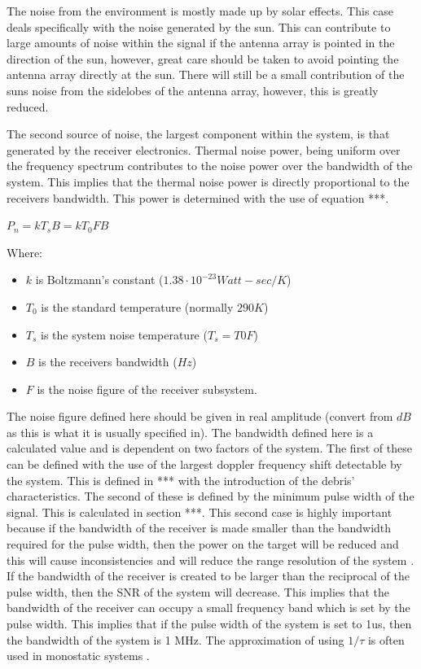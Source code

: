 \documentclass[11pt]{witseiepaper}
\begin{document}
The noise from the environment is mostly made up by solar effects. This case deals specifically with the noise generated by the sun. This can contribute to large amounts of noise within the signal if the antenna array is pointed in the direction of the sun, however, great care should be taken to avoid pointing the antenna array directly at the sun. There will still be a small contribution of the suns noise from the sidelobes of the antenna array, however, this is greatly reduced.

The second source of noise, the largest component within the system, is that generated by the receiver electronics.
Thermal noise power, being uniform over the frequency spectrum contributes to the noise power over the bandwidth of the system. This implies that the thermal noise power is directly proportional to the receivers bandwidth. This power is determined with the use of equation ***.

$P_{n} = k T_{s} B = k T_{0} F B$

Where:
\begin{itemize}
    \item $k$ is Boltzmann's constant ($1.38 \cdot 10^{-23} Watt-sec/K$)
    \item $T_{0}$ is the standard temperature (normally $290 K$)
    \item $T_{s}$ is the system noise temperature ($T_{s} = T{0} F$)
    \item $B$ is the receivers bandwidth ($Hz$)
    \item $F$ is the noise figure of the receiver subsystem.
\end{itemize}

The noise figure defined here should be given in real amplitude (convert from $dB$ as this is what it is usually specified in).
The bandwidth defined here is a calculated value and is dependent on two factors of the system.
The first of these can be defined with the use of the largest doppler frequency shift detectable by the system. This is defined in *** with the introduction of the debris' characteristics.
The second of these is defined by the minimum pulse width of the signal. This is calculated in section ***. 
This second case is highly important because if the bandwidth of the receiver is made smaller than the bandwidth required for the pulse width, then the power on the target will be reduced and this will cause inconsistencies and will reduce the range resolution of the system \cite[p.~65]{radarHandbook}. If the bandwidth of the receiver is created to be larger than the reciprocal of the pulse width, then the SNR of the system will decrease. This implies that the bandwidth of the receiver can occupy a small frequency band which is set by the pulse width. This implies that if the pulse width of the system is set to 1us, then the bandwidth of the system is 1 MHz.
The approximation of using $1/\tau$ is often used in monostatic systems \cite[p.~65]{radarHandbook}.
\end{document}
